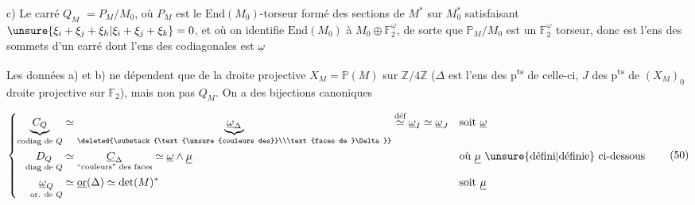 \noindent\makebox[0pt][r]{\rule[-1.4ex]{.4pt}{4.6ex}\quad}c) Le carré $Q_M$   $=P_M/M_0$, où $P_M$ est le $\mathrm{End}(M_0)$-torseur formé des sections de $M^*$ sur $M_0^*$ satisfaisant $\unsure{\xi_i+\xi_j+\xi_h|\xi_i+\xi_j+\xi_k}=0$, et où on identifie $\mathrm{End}(M_0)$ à $M_0\oplus\mathbb F_2^{\underline\omega}$, de sorte que $\mathbb P_M/M_0$ est un $\mathbb F_2^{\underline\omega}$ torseur, donc est l'ens des sommets d'un carré  dont l'ens des codiagonales est $\underline\omega$

\reversemarginpar{}\normalmarginpar

Les données a) et b) ne dépendent que de la  droite projective $X_M=\mathbb P(M)$ sur $\mathbb Z/4\mathbb Z$ ($\Delta$ est l'ens des p\textsuperscript{ts} de celle-ci, $J$  des p\textsuperscript{ts} de $(X_M)_0$ droite projective sur $\mathbb F_2$), mais non pas $Q_M$. On a des bijections canoniques

\[
\left\{\begin{aligned}
\underbrace{C_Q}_{\text{codiag de }Q}&\simeq
\underbrace{\underline\omega_\Delta}_{\deleted{\substack{\text{\unsure{couleurs des}}\\\text{faces de }\Delta}}}
\overset{\text{déf}}{\simeq}\underline\omega_I\simeq\underline\omega_J
&&\text{soit }\underline\omega\\
\underset{\text{diag de }Q}{D_Q}&\simeq
\underset{\text{\textquotedblleft couleurs\textquotedblright\ des faces}}{\underline C_\Delta}
\simeq\underline\omega\wedge\underline\mu
&&\text{où }\underline\mu\ \text{\unsure{défini|définie} ci-dessous}\\
\underset{\text{or. de }Q}{\underline\omega_Q}&\simeq\underline{\mathrm{or}}(\Delta)
\simeq\det(M)^* &&\text{soit }\underline\mu
\end{aligned}\right. \tag*{(50)}
\]
